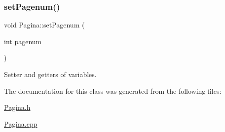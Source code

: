 \subsubsection{\texorpdfstring{set\+Pagenum()}{setPagenum()}}
{\footnotesize\ttfamily void Pagina\+::set\+Pagenum (\begin{DoxyParamCaption}\item[{int}]{pagenum }\end{DoxyParamCaption})}

Setter and getters of variables. 

The documentation for this class was generated from the following files\+:\begin{DoxyCompactItemize}
\item 
\hyperlink{Pagina_8h}{Pagina.\+h}\item 
\hyperlink{Pagina_8cpp}{Pagina.\+cpp}\end{DoxyCompactItemize}
